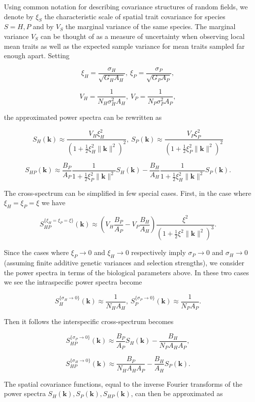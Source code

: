 \documentclass{article}
\begin{document}
Using common notation for describing covariance structures of random
fields, we denote by \(\xi_S\) the characteristic scale of spatial trait
covariance for species \(S=H,P\) and by \(V_S\) the marginal variance of
the same species. The marginal variance \(V_S\) can be thought of as a
measure of uncertainty when observing local mean traits as well as the
expected sample variance for mean traits sampled far enough apart.
Setting

\[\xi_H=\frac{\sigma_H}{\sqrt{G_HA_H}}, \ \xi_P=\frac{\sigma_P}{\sqrt{G_PA_P}},\]

\[V_H=\frac{1}{N_H\sigma_H^2A_H}, \ V_P=\frac{1}{N_P\sigma_P^2A_P},\]

the approximated power spectra can be rewritten as

\[S_H(\pmb k)\approx \frac{V_H\xi_H^2}{(1+\frac{1}{2}\xi_H^2\|\pmb k\|^2)^2}, \ S_P(\pmb k)\approx \frac{V_P\xi_P^2}{(1+\frac{1}{2}\xi_P^2\|\pmb k\|^2)^2}\]

\[S_{HP}(\pmb k)\approx \frac{B_P}{A_P}\frac{1}{1+\frac{1}{2}\xi_P^2\|\pmb k\|^2}S_H(\pmb k)-\frac{B_H}{A_H}\frac{1}{1+\frac{1}{2}\xi_H^2\|\pmb k\|^2}S_P(\pmb k).\]

The cross-spectrum can be simplified in few special cases. First, in the
case where \(\xi_H=\xi_P=\xi\) we have

\[S_{HP}^{\{\xi_H=\xi_P=\xi\}}(\pmb k)\approx\left(V_H\frac{B_P}{A_P}-V_P\frac{B_H}{A_H}\right)\frac{\xi^2}{\left(1+\tfrac{1}{2}\xi^2\|\pmb k\|^2\right)^3}.\]

Since the cases where \(\xi_P\to0\) and \(\xi_H\to0\) respectively imply
\(\sigma_P\to0\) and \(\sigma_H\to0\) (assuming finite additive genetic
variances and selection strengths), we consider the power spectra in
terms of the biological parameters above. In these two cases we see the
intraspecific power spectra become

\[S_H^{\{\sigma_H\to0\}}(\pmb k)\approx\frac{1}{N_HA_H}, \ S_P^{\{\sigma_P\to0\}}(\pmb k)\approx\frac{1}{N_PA_P}.\]

Then it follows the interspecific cross-spectrum becomes

\[S_{HP}^{\{\sigma_P\to0\}}(\pmb k)\approx\frac{B_P}{A_P}S_H(\pmb k)-\frac{B_H}{N_PA_HA_P},\]

\[S_{HP}^{\{\sigma_H\to0\}}(\pmb k)\approx\frac{B_P}{N_HA_HA_P}-\frac{B_H}{A_H}S_P(\pmb k).\]

The spatial covariance functions, equal to the inverse Fourier
transforms of the power spectra
\(S_H(\pmb k),S_P(\pmb k),S_{HP}(\pmb k)\), can then be approximated as
\end{document}
